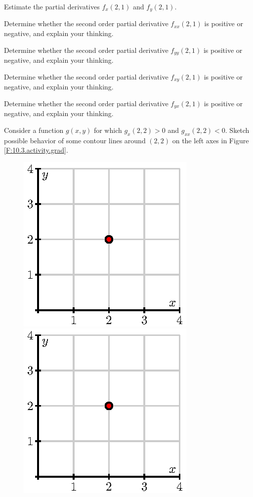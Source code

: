 \begin{activity}
\ba
\item Estimate the partial derivatives $f_x(2,1)$ and $f_y(2,1)$.
\item Determine whether the second order partial derivative
  $f_{xx}(2,1)$ is positive or negative, and explain your thinking.
\item Determine whether the second order partial derivative
  $f_{yy}(2,1)$ is positive or negative, and explain your thinking.
\item Determine whether the second order partial derivative
  $f_{xy}(2,1)$ is positive or negative, and explain your thinking.
\item Determine whether the second order partial derivative
  $f_{yx}(2,1)$ is positive or negative, and explain your thinking.
\item Consider a function $g(x,y)$ for which $g_x(2,2) > 0$ and
  $g_{xx}(2,2) < 0$.  Sketch possible behavior of some contour
  lines around $(2,2)$ on the left axes in Figure \ref{F:10.3.activity.grad}.
  \begin{figure}[ht]
    \begin{center}
      \includegraphics{figures/fig_10_2_activity_grad.eps}
      \hspace*{1in}
      \includegraphics{figures/fig_10_2_activity_grad.eps}

\end{center}
\end{figure}
\end{activity}
